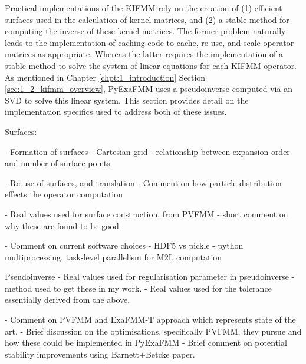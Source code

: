 Practical implementations of the \gls{KIFMM} rely on the creation of (1) efficient
surfaces used in the calculation of kernel matrices, and (2) a stable method for
computing the inverse of these kernel matrices. The former problem naturally leads
to the implementation of caching code to cache, re-use, and scale operator matrices
as appropriate. Whereas the latter requires the implementation of a stable method to
solve the system of linear equations for each \gls{KIFMM} operator. As mentioned
in Chapter \ref{chpt:1_introduction} Section \ref{sec:1_2_kifmm_overview}, \gls{PyExaFMM} uses
a pseudoinverse computed via an SVD to solve this linear system. This section
provides detail on the implementation specifics used to address both of these issues.


Surfaces:

- Formation of surfaces
    - Cartesian grid
    - relationship between expansion order and number of surface points

- Re-use of surfaces, and translation
    - Comment on how particle distribution effects the operator computation

- Real values used for surface construction, from PVFMM
    - short comment on why these are found to be good

- Comment on current software choices
    - HDF5 vs pickle
    - python multiprocessing, task-level parallelism for M2L computation

Pseudoinverse
- Real values used for regularisation parameter in pseudoinverse
    - method used to get these in my work.
    - Real values used for the tolerance essentially derived from the above.

- Comment on PVFMM and ExaFMM-T approach which represents state of the art.
    - Brief discussion on the optimisations, specifically PVFMM,
    they pursue and how these could be implemented in PyExaFMM
    - Brief comment on potential stability improvements using Barnett+Betcke
    paper.
